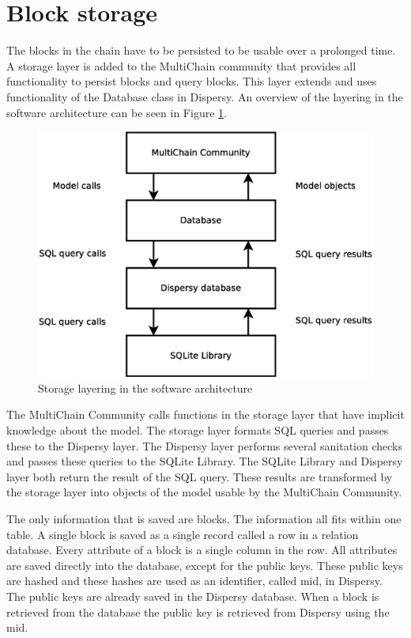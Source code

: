 \section{Block storage}
The blocks in the chain have to be persisted to be usable over a prolonged time.
A storage layer is added to the MultiChain community
that provides all functionality to persist blocks and query blocks.
This layer extends and uses functionality of the Database class in Dispersy.
An overview of the layering in the software architecture can be seen in Figure \ref{fig:storage-layer}.

\begin{figure}
	\centerline{\includegraphics[scale=0.3]{design/figs/persistence-layer.eps}}
	\caption{Storage layering in the software architecture}
	\label{fig:storage-layer}
\end{figure}

The MultiChain Community calls functions in the storage layer that have implicit knowledge about the model.
The storage layer formats SQL queries and passes these to the Dispersy layer.
The Dispersy layer performs several sanitation checks and passes these queries to the SQLite Library.
The SQLite Library and Dispersy layer both return the result of the SQL query.
These results are transformed by the storage layer into objects of the model usable by the MultiChain Community.

The only information that is saved are blocks.
The information all fits within one table.
A single block is saved as a single record called a row in a relation database.
Every attribute of a block is a single column in the row.
All attributes are saved directly into the database,
except for the public keys.
These public keys are hashed and these hashes are used as an identifier, called mid, in Dispersy.
The public keys are already saved in the Dispersy database.
When a block is retrieved from the database the public key is retrieved from Dispersy using the mid.

